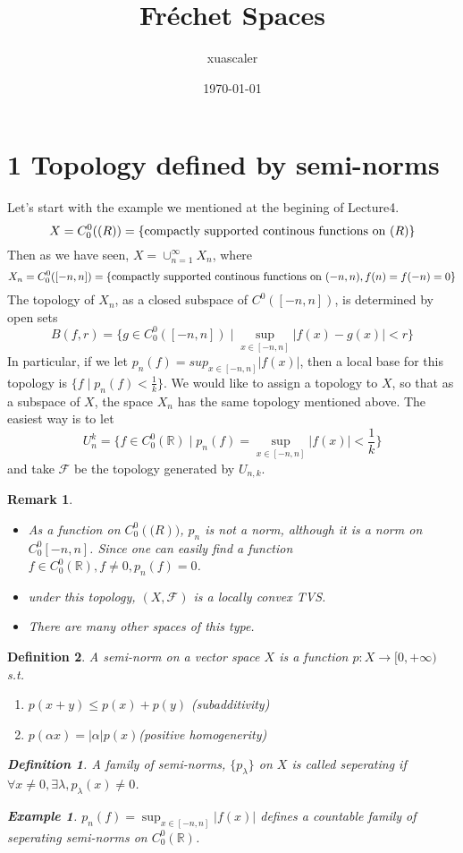 \documentclass{article}
\title{Fr\'echet Spaces}
\author{xuascaler}
\date{\today}
\newtheorem*{definition}{Definition}
\newtheorem*{remark}{Remark}
\newtheorem*{example}{Example}
\begin{document}
\maketitle

\section*{1 Topology defined by semi-norms}
Let's start with the example we mentioned at the begining of Lecture4.
\[
    X = C_0^0(\mathbb(R)) = \{ \textnormal{compactly supported continous functions on } \mathbb(R)\}
\]
Then as we have seen, $X = \cup_{n=1}^{\infty}X_n$, where
\[
    X_n = C_0^0([-n, n]) = \{ \textnormal{compactly supported continous functions on } (-n, n), f(n) = f(-n) = 0\}
\]
The topology of $X_n$, as a closed subspace of $C^0([-n, n])$, is determined by open sets
\[
    B(f, r) = \{ g \in C^0_0([-n, n]) \mid \sup_{x \in [-n, n]}|f(x) - g(x)| < r \}
\]
In particular, if we let $p_n(f) = sup_{x\in[-n, n]}{|f(x)|}$, then a local base for this topology is $\{f \mid p_n(f) < \frac{1}{k}\}$.
We would like to assign a topology to $X$, so that as a subspace of $X$, the space $X_n$ has the same topology mentioned above.
The easiest way is to let 
\[U_{n}^{k} = \{f \in C_0^0(\mathbb{R}) \mid p_n(f) = \sup_{x \in [-n, n]}{|f(x)| < \frac{1}{k}}\}\]
and take $\mathcal{F}$ be the topology generated by $U_{n,k}$.
\begin{remark}
    \begin{itemize}
        \item As a function on $C_0^0(\mathbb(R))$, $p_n$ is not a norm, although it is a norm on $C_0^0{[-n, n]}$.
        Since one can easily find a function $f \in C_0^0(\mathbb{R}), f \ne 0, p_n(f) = 0$.
        \item under this topology, $(X, \mathcal{F})$ is a locally convex TVS.
        \item There are many other spaces of this type.
    \end{itemize}
\end{remark}
\begin{definition}
    A semi-norm on a vector space $X$ is a function $p: X \rightarrow [0, + \infty)$ s.t.
    \begin{enumerate}
        \item $p(x + y) \le p(x) + p(y)$ (subadditivity)
        \item $p(\alpha x) = |\alpha| p(x)$(positive homogenerity)
    \end{enumerate}
    \begin{definition}
        A family of semi-norms, $\{p_{\lambda}\}$ on $X$ is called seperating if $ \forall x \ne 0, \exists \lambda, p_{\lambda}(x) \ne 0$.
    \end{definition}
    \begin{example}
        $p_n(f) = \sup_{x \in [-n, n]}{|f(x)|}$ defines a countable family of seperating semi-norms on $C_0^0(\mathbb{R})$.
    \end{example}
\end{definition}
\end{document}
